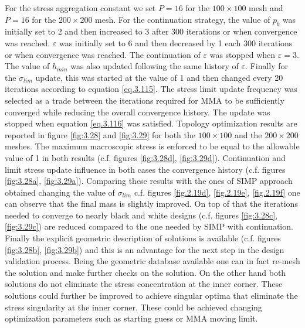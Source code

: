 For the stress aggregation constant we set $P=16$ for the $100\times100$ mesh and $P=16$ for the $200\times200$ mesh.
For the continuation strategy, the value of $p_b$ was initially set to 2 and then increased to 3 after 300 iterations or when convergence was reached. $\varepsilon$ was initially set to 6 and then decreased by 1 each 300 iterations or when convergence was reached.  The continuation of $\varepsilon$ was stopped when $\varepsilon=3$. The value of $h_{min}$ was also updated following the same history of $\varepsilon$. Finally for the $\sigma_{lim}$ update, this was started at the value of 1 and then changed every 20 iterations according to equation \ref{eq.3.115}. The stress limit update frequency was selected as a trade between the iterations required for MMA to be sufficiently converged while reducing the overall convergence history. The update was stopped when equation \ref{eq.3.116} was satisfied. Topology optimization results are reported in figure \ref{fig:3.28} and \ref{fig:3.29} for both the $100\times100$ and the $200\times200$ meshes. The maximum macroscopic stress is enforced to be equal to the allowable value of 1 in both results (c.f. figures \ref{fig:3.28d}, \ref{fig:3.29d}). Continuation and limit stress update influence in both cases the convergence history (c.f. figures \ref{fig:3.28a}, \ref{fig:3.29a}).  Comparing these results with the ones of SIMP approach obtained changing the value of $\sigma_{lim}$ c.f. figures \ref{fig.2.19d}, \ref{fig.2.19e}, \ref{fig.2.19f} one can observe that the final mass is slightly improved.  
 On top of that the iterations needed to converge to nearly black and white designs  (c.f. figures \ref{fig:3.28c}, \ref{fig:3.29c}) are reduced compared to the one needed by SIMP with continuation. Finally the explicit geometric description of solutions is available (c.f. figures \ref{fig:3.28b}, \ref{fig:3.29b}) and this is an advantage for the next step in the design validation process. Being the geometric database available one can in fact re-mesh the solution and make further checks on the solution.
 On the other hand both solutions do not eliminate the stress concentration at the inner corner. These solutions could further be improved to achieve singular optima that eliminate the stress singularity at the inner corner. These could be achieved changing optimization parameters such as starting guess or MMA moving limit. 
